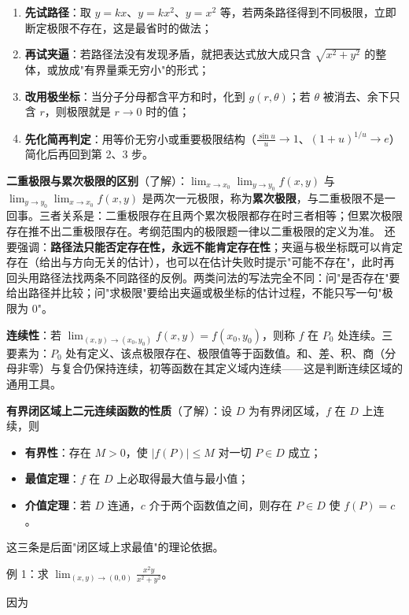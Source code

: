 \documentclass[11pt,openany,UTF8]{ctexbook}
\begin{document}
\begin{enumerate}
\item \textbf{先试路径}：取 $y=kx$、$y=kx^{2}$、$y=x^{2}$ 等，若两条路径得到不同极限，立即断定极限不存在，这是最省时的做法；
\item \textbf{再试夹逼}：若路径法没有发现矛盾，就把表达式放大成只含 $\sqrt{x^{2}+y^{2}}$ 的整体，或放成"有界量乘无穷小"的形式；
\item \textbf{改用极坐标}：当分子分母都含平方和时，化到 $g(r,\theta)$；若 $\theta$ 被消去、余下只含 $r$，则极限就是 $r\to 0$ 时的值；
\item \textbf{先化简再判定}：用等价无穷小或重要极限结构（$\frac{\sin u}{u}\to 1$、$(1+u)^{1/u}\to e$）简化后再回到第 2、3 步。
\end{enumerate}
\textbf{二重极限与累次极限的区别}（了解）：$\lim_{x\to x_0}\lim_{y\to y_0}f(x,y)$ 与 $\lim_{y\to y_0}\lim_{x\to x_0}f(x,y)$ 是两次一元极限，称为\textbf{累次极限}，与二重极限不是一回事。三者关系是：二重极限存在且两个累次极限都存在时三者相等；但累次极限存在推不出二重极限存在。考纲范围内的极限题一律以二重极限的定义为准。 还要强调：\textbf{路径法只能否定存在性，永远不能肯定存在性}；夹逼与极坐标既可以肯定存在（给出与方向无关的估计），也可以在估计失败时提示"可能不存在"，此时再回头用路径法找两条不同路径的反例。两类问法的写法完全不同：问"是否存在"要给出路径并比较；问"求极限"要给出夹逼或极坐标的估计过程，不能只写一句"极限为 $0$"。

\textbf{连续性}：若 $\displaystyle\lim_{(x,y)\to(x_0,y_0)}f(x,y)=f(x_0,y_0)$，则称 $f$ 在 $P_0$ 处连续。三要素为：$P_0$ 处有定义、该点极限存在、极限值等于函数值。和、差、积、商（分母非零）与复合仍保持连续，初等函数在其定义域内连续——这是判断连续区域的通用工具。

\textbf{有界闭区域上二元连续函数的性质}（了解）：设 $D$ 为有界闭区域，$f$ 在 $D$ 上连续，则

\begin{itemize}
\item \textbf{有界性}：存在 $M>0$，使 $\vert f(P)\vert\le M$ 对一切 $P\in D$ 成立；
\item \textbf{最值定理}：$f$ 在 $D$ 上必取得最大值与最小值；
\item \textbf{介值定理}：若 $D$ 连通，$c$ 介于两个函数值之间，则存在 $P\in D$ 使 $f(P)=c$。
\end{itemize}
这三条是后面"闭区域上求最值"的理论依据。

例 1：求 $\displaystyle\lim_{(x,y)\to(0,0)}\frac{x^{2}y}{x^{2}+y^{2}}$。

因为
\end{document}
